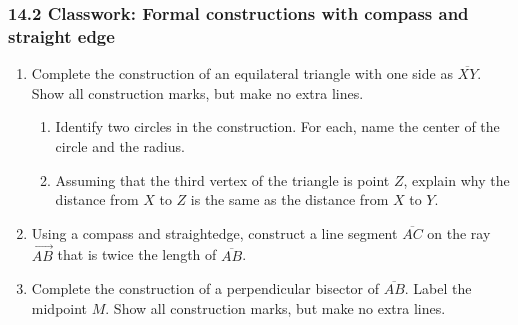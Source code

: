 \documentclass[12pt, twoside]{article}
\begin{document}
\subsubsection*{14.2 Classwork: Formal constructions with compass and straight edge}
\begin{enumerate}
\item Complete the construction of an equilateral triangle with one side as $\overline{XY}$. Show all construction marks, but make no extra lines. \vspace{6cm}
\begin{center}
\end{center} \vspace{1cm}
\begin{enumerate}
  \item Identify two circles in the construction. For each, name the center of the circle and the radius.  \vspace{2cm}
  \item Assuming that the third vertex of the triangle is point $Z$, explain why the distance from $X$ to $Z$ is the same as the distance from $X$ to $Y$.
\end{enumerate} \vspace{2cm}

\item Using a compass and straightedge, construct a line segment $\overline{AC}$ on the ray $\overrightarrow{AB}$ that is twice the length of $\overline{AB}$.\vspace{2cm}
  \begin{center}
\end{center}

\newpage
\item Complete the construction of a perpendicular bisector of $\overline{AB}$. Label the midpoint $M$. Show all construction marks, but make no extra lines. \vspace{2cm}
  \begin{center}
  \end{center} \vspace{1cm}


\end{enumerate}
\end{document}
